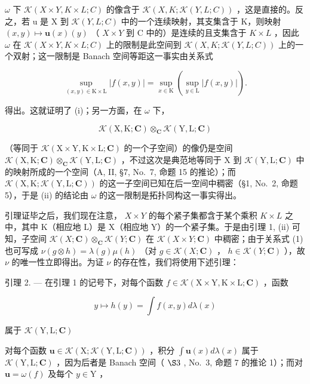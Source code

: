 \(\omega\) 下 \(\mathcal{K}(X\times Y,K\times L;C)\) 的像含于 \(\mathcal{K}(X,K;\mathcal{K}(Y,L;C))\) ，这是直接的。反之，若 u 是 X 到 \(\mathcal{K}(Y,L;C)\) 中的一个连续映射，其支集含于 K，则映射 \((x,y)\mapsto\mathbf{u}(x)(y)\) （ \(X\times Y\) 到 C 中的）是连续的且支集含于 \(K\times L\) ，因此 \(\omega\) 在 \(\mathcal{K}(X\times Y,K\times L;C)\) 上的限制是此空间到 \(\mathcal{K}(X,K;\mathcal{K}(Y,L;C))\) 上的一个双射；这一限制是 Banach 空间等距这一事实由关系式

\[
\sup _ {(x, y) \in \mathrm{K} \times \mathrm{L}} | f (x, y) | = \sup _ {x \in \mathrm{K}} \left(\sup _ {y \in \mathrm{L}} | f (x, y) |\right).
\]

得出。这就证明了 (i)；另一方面，在 \(\omega\) 下，

\[
\mathcal {K} (\mathrm{X}, \mathrm{K}; \mathbf {C}) \otimes_ {\mathbf {C}} \mathcal {K} (\mathrm{Y}, \mathrm{L}; \mathbf {C})
\]

（等同于 \(\mathcal{K}(\mathrm{X}\times \mathrm{Y},\mathrm{K}\times \mathrm{L};\mathbf{C})\) 的一个子空间）的像仍是空间 \(\mathcal{K}(\mathrm{X},\mathrm{K};\mathbf{C})\otimes_{\mathbf{C}}\mathcal{K}(\mathrm{Y},\mathrm{L};\mathbf{C})\) ，不过这次是典范地等同于 X 到 \(\mathcal{K}(\mathrm{Y},\mathrm{L};\mathbf{C})\) 中的映射所成的一个空间（A, II, §7, No.~7, 命题 15 的推论）；而 \(\mathcal{K}(\mathrm{X},\mathrm{K};\mathcal{K}(\mathrm{Y},\mathrm{L};\mathbf{C}))\) 的这一子空间已知在后一空间中稠密（§1, No.~2, 命题 5），于是 (ii) 的结论由 \(\omega\) 的这一限制是拓扑同构这一事实得出。

引理证毕之后，我们现在注意， \(X \times Y\) 的每个紧子集都含于某个乘积 \(K \times L\) 之中，其中 K（相应地 L）是 X（相应地 Y）的一个紧子集。于是由引理 1, (ii) 可知，子空间 \(\mathcal{K}(X; \mathbf{C}) \otimes_{\mathbf{C}} \mathcal{K}(Y; \mathbf{C})\) 在 \(\mathcal{K}(X \times Y; \mathbf{C})\) 中稠密；由于关系式 (1) 也可写成 \(\nu(g \otimes h) = \lambda(g)\mu(h)\) （对 \(g \in \mathcal{K}(X; \mathbf{C})\) ， \(h \in \mathcal{K}(Y; \mathbf{C})\) ），故 \(\nu\) 的唯一性立即得出。为证 \(\nu\) 的存在性，我们将使用下述引理：

引理 2. --- 在引理 1 的记号下，对每个函数 \(f \in \mathcal{K}(\mathrm{X} \times \mathrm{Y}, \mathrm{K} \times \mathrm{L}; \mathbf{C})\) ，函数

\[
y \mapsto h (y) = \int f (x, y) d \lambda (x)\tag{2}
\]

属于 \(\mathcal{K}(\mathrm{Y},\mathrm{L};\mathbf{C})\)

对每个函数 \(\mathbf{u} \in \mathcal{K}(\mathrm{X};\mathcal{K}(\mathrm{Y},\mathrm{L};\mathbf{C}))\) ，积分 \(\int \mathbf{u}(x)d\lambda (x)\) 属于 \(\mathcal{K}(\mathrm{Y},\mathrm{L};\mathbf{C})\) ，因为后者是 Banach 空间（ \(\S 3\) , No.~3, 命题 7 的推论 1）；而对 \(\mathbf{u} = \omega(f)\) 及每个 \(y \in \mathrm{Y}\) ，

